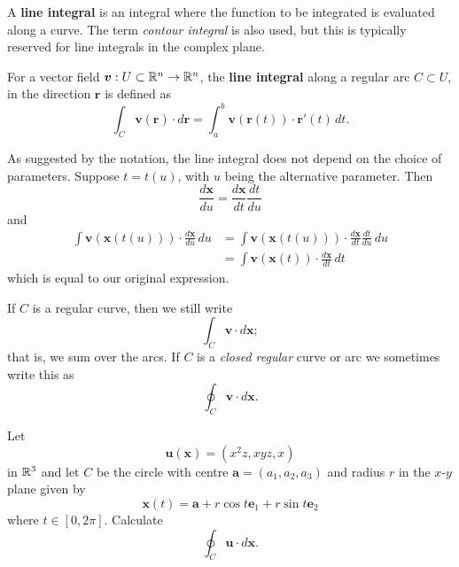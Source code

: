
A \textbf{line integral} is an integral where the function to be
integrated is evaluated along a curve.
The term \emph{contour integral} is also used,
but this is typically reserved for line integrals in the complex plane.

\begin{definition}
    For a vector field $\bm v: U \subset \mathbb{R}^n \to \mathbb{R}^n$, 
    the \textbf{line integral} along a regular arc $C \subset U$,
    in the direction $\bm r$ is defined as
    \[
        \int_C \bm v(\bm r) \cdot d\bm r =
        \int_a^b \bm v(\bm r(t)) \cdot \bm r'(t) \, dt.
    \]
\end{definition}

\begin{remark}
    As suggested by the notation,
    the line integral does not depend on the choice of parameters.
    Suppose $t = t(u)$, with $u$ being the alternative parameter.
    Then
    \[
        \frac{d\bm x}{du} = \frac{d\bm x}{dt} \frac{dt}{du} \tag{chain rule}
    \]
    and
    \begin{align*}
        \int \bm v(\bm x(t(u))) \cdot \frac{d\bm x}{du} \, du
        &= \int \bm v(\bm x(t(u))) \cdot \frac{d\bm x}{dt} \frac{dt}{du} \, du \\
        &= \int \bm v(\bm x(t)) \cdot \frac{d\bm x}{dt} \, dt
    \end{align*}
    which is equal to our original expression.
\end{remark}

If $C$ is a regular curve, then we still write
\[
    \int_C \bm v \cdot d\bm x;
\]
that is, we sum over the arcs.
If $C$ is a \emph{closed regular} curve or arc we sometimes write this as
\[ \oint_C \bm v \cdot d\bm x. \]

\begin{example}
    Let
    \[
        \bm u(\bm x) =
        (x^2z, xyz, x)
    \]
    in $\mathbb{R}^3$ and let $C$ be the circle with centre
    $\bm a = (a_1, a_2, a_3)$ and radius $r$ in the $x$-$y$ plane
    given by
    \[
        \bm x(t) = \bm a + r\cos t \bm e_1 + r\sin t \bm e_2
    \]
    where $t \in [0, 2\pi]$.
    Calculate
    \[
        \oint_C \bm u \cdot d\bm x.
    \]
\end{example}

